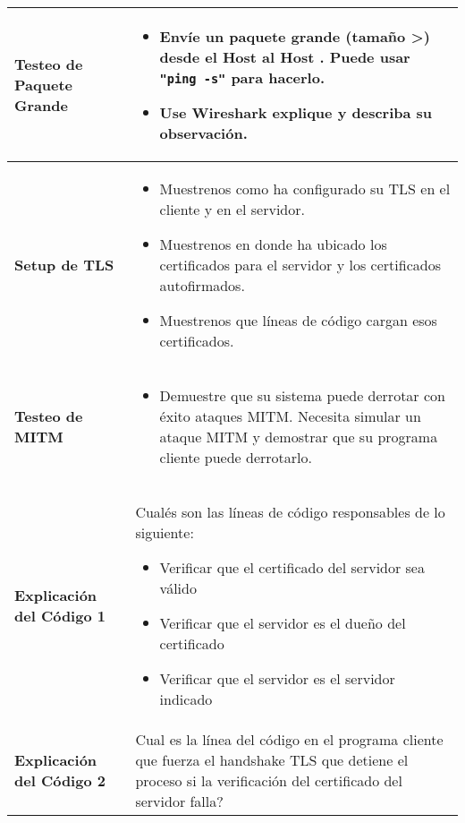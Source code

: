 \begin{longtable}{|p{}|p{}|}
 \textbf{Testeo de Paquete Grande} & 
 	\vspace*{-0.3cm}
 	\begin{itemize}[topsep=-0.5cm,leftmargin=0.4cm]
 	\item Envíe un paquete grande (tamaño \textgreater\space 3000) desde el Host \hostu al Host \hostv. Puede usar \texttt{"ping -s"} para hacerlo.

	\item Use Wireshark explique y describa su observación.
	\end{itemize}
 \\ 
 \hline

 \textbf{Setup de TLS} & 
 	\vspace*{-0.3cm}
 	\begin{itemize}[topsep=-0.5cm,leftmargin=0.4cm]
 		\item Muestrenos como ha configurado su TLS en el cliente y en el servidor.
 		\item Muestrenos en donde ha ubicado los certificados para el servidor y los certificados autofirmados.
 		\item Muestrenos que líneas de código cargan esos certificados.
	\end{itemize}
 \\ 
 \hline

 \textbf{Testeo de MITM} & 
 	\vspace*{-0.3cm}
 	\begin{itemize}[topsep=-0.5cm,leftmargin=0.4cm]
 		\item Demuestre que su sistema puede derrotar con éxito ataques MITM. Necesita simular un ataque MITM y demostrar que su programa cliente puede derrotarlo.
	\end{itemize}
 \\ 
 \hline

 \textbf{Explicación del Código 1} & 
	Cualés son las líneas de código responsables de lo siguiente:
 	\vspace*{0.2cm}
 	\begin{itemize}[topsep=-0.5cm,leftmargin=0.4cm]
 		\item Verificar que el certificado del servidor sea válido
 		\item Verificar que el servidor es el dueño del certificado
 		\item Verificar que el servidor es el servidor indicado
	\end{itemize}
 \\ 
 \hline

 \textbf{Explicación del Código 2} & 
 	Cual es la línea del código en el programa cliente que fuerza el handshake TLS que detiene el proceso si la verificación del certificado del servidor falla?
 \\ 
 \hline


\end{longtable}
